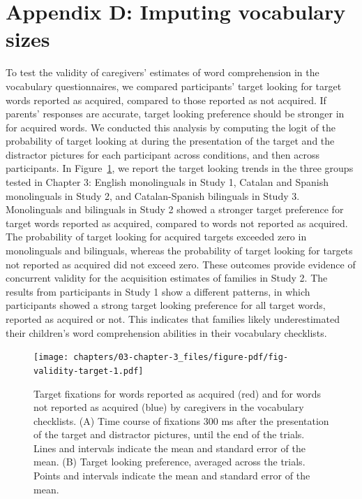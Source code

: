 \documentclass[
  12pt,
  b5paperpaper,
  twoside]{scrreprt}
\begin{document}
\hypertarget{appendix-d-imputing-vocabulary-sizes}{%
\section{Appendix D: Imputing vocabulary
sizes}\label{appendix-d-imputing-vocabulary-sizes}}

To test the validity of caregivers' estimates of word comprehension in
the vocabulary questionnaires, we compared participants' target looking
for target words reported as acquired, compared to those reported as not
acquired. If parents' responses are accurate, target looking preference
should be stronger in for acquired words. We conducted this analysis by
computing the logit of the probability of target looking at during the
presentation of the target and the distractor pictures for each
participant across conditions, and then across participants. In
Figure~\ref{fig-validity-target}, we report the target looking trends in
the three groups tested in Chapter 3: English monolinguals in Study 1,
Catalan and Spanish monolinguals in Study 2, and Catalan-Spanish
bilinguals in Study 3. Monolinguals and bilinguals in Study 2 showed a
stronger target preference for target words reported as acquired,
compared to words not reported as acquired. The probability of target
looking for acquired targets exceeded zero in monolinguals and
bilinguals, whereas the probability of target looking for targets not
reported as acquired did not exceed zero. These outcomes provide
evidence of concurrent validity for the acquisition estimates of
families in Study 2. The results from participants in Study 1 show a
different patterns, in which participants showed a strong target looking
preference for all target words, reported as acquired or not. This
indicates that families likely underestimated their children's word
comprehension abilities in their vocabulary checklists.

\begin{figure}

{\centering \texttt{[image: chapters/03-chapter-3\_files/figure-pdf/fig-validity-target-1.pdf]}

}

\caption{\label{fig-validity-target}Target fixations for words reported
as acquired (red) and for words not reported as acquired (blue) by
caregivers in the vocabulary checklists. (A) Time course of fixations
300 ms after the presentation of the target and distractor pictures,
until the end of the trials. Lines and intervals indicate the mean and
standard error of the mean. (B) Target looking preference, averaged
across the trials. Points and intervals indicate the mean and standard
error of the mean.}

\end{figure}
\end{document}
